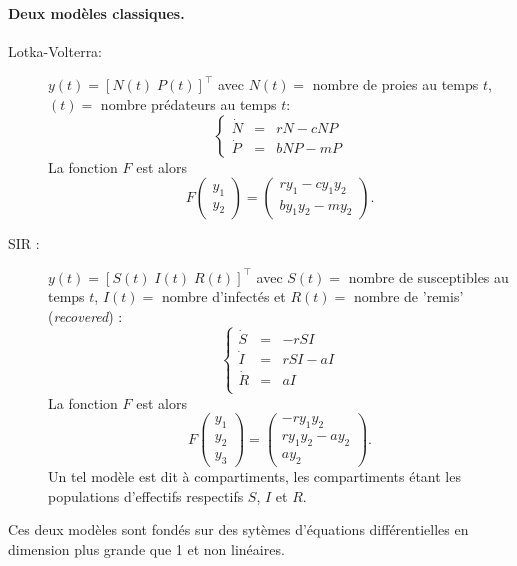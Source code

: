 \paragraph*{Deux modèles classiques.}
\begin{description}
 \item[Lotka-Volterra:] $y(t) = [N(t) \; P(t)]^\top$ avec $N(t) =$ nombre de proies au temps $t$, $(t) = $ nombre prédateurs au temps $t$:
 $$
 \left\{ \begin{array}{rcl} 
  \dot N & = & r N - c N P \\
  \dot P & = & b N P  - m P
 \end{array} \right.
 $$
 La fonction $F$ est alors
 $$
 F\left(\begin{array}{c} y_1 \\ y_2 \end{array}\right) 
 = \left(\begin{array}{c} r y_1 - c y_1 y_2 \\ b y_1 y_2 - m y_2 \end{array}\right).
 $$
 \item[SIR :] $y(t) = [S(t) \; I(t) \; R(t)]^\top$ avec $S(t) =$ nombre de susceptibles au temps $t$, $I(t) =$ nombre d'infectés et $R(t) =$ nombre de 'remis' ({\em recovered}) :
 $$
 \left\{ \begin{array}{rcl} 
  \dot S & = & - r S I \\
  \dot I & = & r S I - a I \\
  \dot R & = & a I \\
 \end{array} \right.
 $$
 La fonction $F$ est alors
 $$
 F\left(\begin{array}{c} y_1 \\ y_2 \\ y_3 \end{array}\right) 
 = \left(\begin{array}{c} -r y_1 y_2 \\ r y_1 y_2 - a y_2 \\ a y_2 \end{array}\right).
 $$
 Un tel modèle est dit à compartiments, les compartiments étant les populations d'effectifs respectifs $S$, $I$ et $R$. 
\end{description}

Ces deux modèles sont fondés sur des sytèmes d'équations différentielles en dimension plus grande que 1 et non linéaires.

